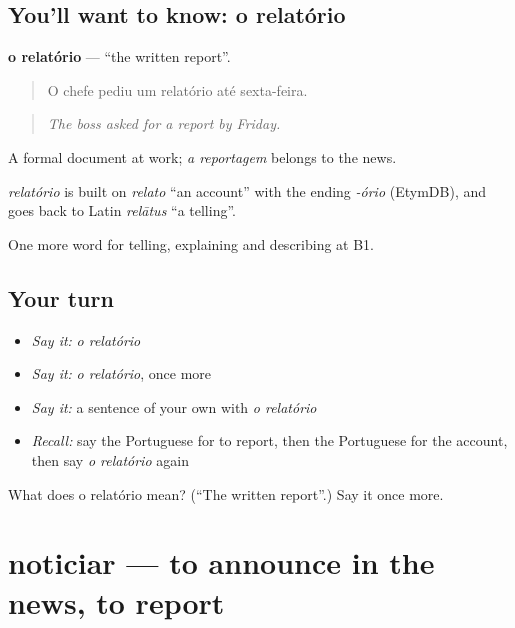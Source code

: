 \subsection*{You'll want to know: o relatório}
\textbf{o relatório} — \textquotedblleft{}the written report\textquotedblright{}.

\begin{quote}
O chefe pediu um relatório até sexta-feira.
\end{quote}

\begin{quote}
\emph{The boss asked for a report by Friday.}
\end{quote}

A formal document at work; \emph{a reportagem} belongs to the news.

\begin{cousinweb}
\emph{relatório} is built on \emph{relato} \textquotedblleft{}an account\textquotedblright{} with the ending \emph{-ório} (EtymDB), and goes back to Latin \emph{relātus} \textquotedblleft{}a telling\textquotedblright{}.
\end{cousinweb}

\begin{grammarlens}[title={What you've built}]
One more word for telling, explaining and describing at B1.
\end{grammarlens}

\subsection*{Your turn}
\begin{itemize}
\raggedright
  \item \emph{Say it:} \emph{o relatório}
  \item \emph{Say it:} \emph{o relatório}, once more
  \item \emph{Say it:} a sentence of your own with \emph{o relatório}
  \item \emph{Recall:} say the Portuguese for to report, then the Portuguese for the account, then say \emph{o relatório} again
\end{itemize}

\begin{tcolorbox}[breakable,colback=teal!4,colframe=teal!35!black,title={Before you move on}]
What does o relatório mean? (\textquotedblleft{}The written report\textquotedblright{}.) Say it once more.
\end{tcolorbox}
\section[noticiar]{noticiar — to announce in the news, to report}

